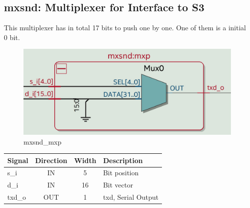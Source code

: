 \documentclass[12pt,a4 paper] {report}
\begin{document}
\newpage

\subsection{mxsnd: Multiplexer for Interface to S3}
This multiplexer has in total 17 bits to push one by one. One of them is a initial 0 bit.
\begin{figure}[h]
	\centering	
	\includegraphics[scale=0.15]{../png/mxsnd_mxp.png}
	\caption{mxsnd\_mxp}
\end{figure}
\begin{center}
	\begin{tabular}{ | p{2cm} | c | c | p{5cm} |}
		\hline
		\textbf{Signal} & \textbf{Direction} & \textbf{Width} & \textbf{Description} \\
		\hline
		s\_i & IN & 5 & Bit position \\
		\hline
		d\_i & IN & 16 &  Bit vector \\
		\hline	
		txd\_o & OUT & 1 & txd, Serial Output \\
		\hline
	\end{tabular}
\end{center}

\newpage
\end{document}
